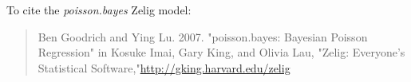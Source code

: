 To cite the \emph{ poisson.bayes } Zelig model:
 \begin{verse}
 Ben Goodrich and Ying Lu. 2007. "poisson.bayes: Bayesian Poisson Regression" in Kosuke Imai, Gary King, and Olivia Lau, "Zelig: Everyone's Statistical Software,"\url{http://gking.harvard.edu/zelig} 
\end{verse}